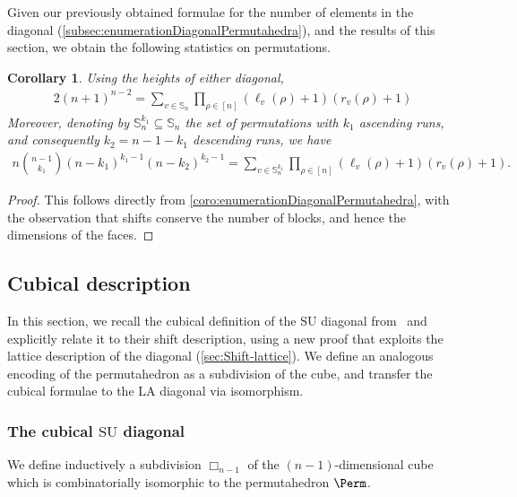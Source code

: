 \documentclass{amsart}
\newtheorem{corollary}[theorem]{Corollary}
\theoremstyle{definition}
\newcommand{\SU}{\mathrm{SU}}
\newcommand{\LA}{\mathrm{LA}}
\newcommand{\divcube}[1]{\Box_{#1}}
\begin{document}
Given our previously obtained formulae for the number of elements in the diagonal (\cref{subsec:enumerationDiagonalPermutahedra}), and the results of this section, we obtain the following statistics on permutations.

\begin{corollary}
Using the heights of either diagonal,
\begin{align*}
2(n+1)^{n-2} = \sum_{v \in \mathbb{S}_n} \prod_{\rho \in [n]} (\ell_v(\rho)+1)(r_v(\rho)+1)
\end{align*}
Moreover, denoting by $\mathbb{S}_n^{k_1} \subseteq \mathbb{S}_n$ the set of permutations with $k_1$ ascending runs, and consequently $k_2 = n-1-k_1$ descending runs, we have 
\begin{align*}
n \binom{n-1}{k_1} (n-k_1)^{k_1-1} (n-k_2)^{k_2-1} = \sum_{v \in \mathbb{S}_n^{k_1}} \prod_{\rho \in [n]} (\ell_v(\rho)+1)(r_v(\rho)+1).
\end{align*}
\end{corollary}

\begin{proof}
This follows directly from \cref{coro:enumerationDiagonalPermutahedra}, with the observation that shifts conserve the number of blocks, and hence the dimensions of the faces.
\end{proof}



\subsection{Cubical description}
\label{sec:Cubical}

In this section, we recall the cubical definition of the $\SU$ diagonal from~\cite{SaneblidzeUmble-comparingDiagonals} and explicitly relate it to their shift description, using a new proof that exploits the lattice description of the diagonal (\cref{sec:Shift-lattice}).
We define an analogous encoding of the permutahedron as a subdivision of the cube, and transfer the cubical formulae to the $\LA$ diagonal via isomorphism.

\subsubsection{The cubical $\SU$ diagonal}
We define inductively a subdivision $\divcube{n-1}$ of the $(n-1)$-dimensional cube  which is combinatorially isomorphic to the permutahedron $\Perm$.
\end{document}
